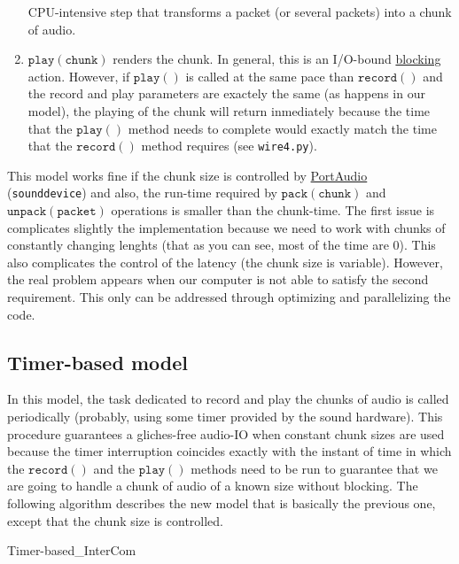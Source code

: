 \begin{enumerate}
  CPU-intensive step that transforms a packet (or several packets)
  into a chunk of audio.
\item $\mathtt{play(chunk)}$ renders the chunk. In general, this is an
  I/O-bound
  \href{https://python-sounddevice.readthedocs.io/en/0.4.0/api/streams.html#sounddevice.Stream.write}{blocking}
  action. However, if $\mathtt{play()}$ is called at the same pace
  than $\mathtt{record()}$ and the record and play parameters are
  exactely the same (as happens in our model), the playing of the
  chunk will return inmediately because the time that the
  $\mathtt{play()}$ method needs to complete would exactly match the
  time that the $\mathtt{record()}$ method requires (see
  \texttt{wire4.py}).
\end{enumerate}

This model works fine if the chunk size is controlled by
\href{http://www.portaudio.com/}{PortAudio}~\cite{portaudio}
(\texttt{sounddevice}) and also, the run-time required by
$\mathtt{pack(chunk)}$ and $\mathtt{unpack(packet)}$ operations is
smaller than the chunk-time. The first issue is complicates slightly
the implementation because we need to work with chunks of constantly
changing lenghts (that as you can see, most of the time are 0). This
also complicates the control of the latency (the chunk size is
variable). However, the real problem appears when our computer is not
able to satisfy the second requirement. This only can be addressed
through optimizing and parallelizing the code.

\subsection{Timer-based model}

In this model, the task dedicated to record and play the chunks of
audio is called periodically (probably, using some timer provided by
the sound hardware). This procedure guarantees a gliches-free audio-IO
when constant chunk sizes are used because the timer interruption
coincides exactly with the instant of time in which the
$\mathtt{record()}$ and the $\mathtt{play()}$ methods need to be run
to guarantee that we are going to handle a chunk of audio of a known
size without blocking. The following algorithm describes the new model
that is basically the previous one, except that the chunk size is
controlled.

\begin{pseudocode}{Timer-based\_InterCom}{~}
  \BEGIN
     \GETS {}\\
     \GETS {}\\
    \\
     \GETS {}\\
     \GETS {}\\
  \END
  \ENDPROCEDURE
\end{pseudocode}

